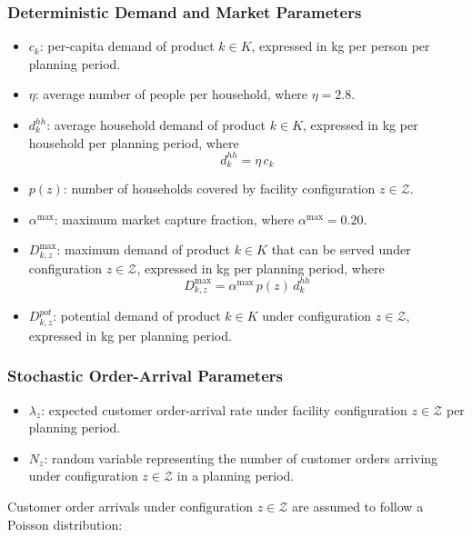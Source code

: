 \documentclass[12pt]{article}
\begin{document}
\subsubsection{Deterministic Demand and Market Parameters}
\begin{itemize}
    \item $c_k$: per-capita demand of product $k \in K$, expressed in kg per person per planning period.

    \item $\eta$: average number of people per household, where $\eta = 2.8$.

    \item $d^{hh}_k$: average household demand of product $k \in K$, expressed in kg per household per planning period, where
    \[
    d^{hh}_k = \eta \, c_k
    \]

    \item $p(z)$: number of households covered by facility configuration $z \in \mathcal{Z}$.

    \item $\alpha^{\max}$: maximum market capture fraction, where $\alpha^{\max} = 0.20$.

    \item $D^{\max}_{k,z}$: maximum demand of product $k \in K$ that can be served under configuration $z \in \mathcal{Z}$, expressed in kg per planning period, where
    \[
    D^{\max}_{k,z} = \alpha^{\max} \, p(z)\, d^{hh}_k
    \]

    \item $D^{pot}_{k,z}$: potential demand of product $k \in K$ under configuration $z \in \mathcal{Z}$, expressed in kg per planning period.
\end{itemize}

\subsubsection{Stochastic Order-Arrival Parameters}
\begin{itemize}
    \item $\lambda_z$: expected customer order-arrival rate under facility configuration $z \in \mathcal{Z}$ per planning period.

    \item $N_z$: random variable representing the number of customer orders arriving under configuration $z \in \mathcal{Z}$ in a planning period.
\end{itemize}

Customer order arrivals under configuration $z \in \mathcal{Z}$ are assumed to follow a Poisson distribution:
\end{document}
